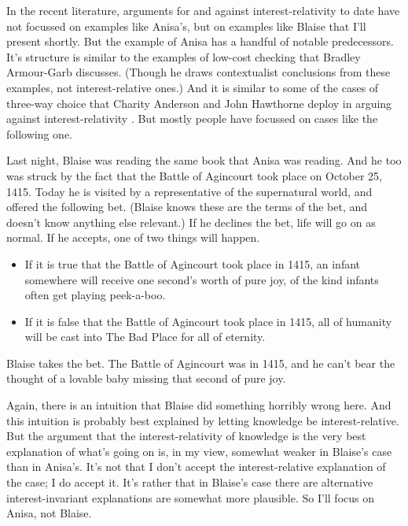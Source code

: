 \documentclass[
  11pt,
]{book}
\providecommand{\tightlist}{%
  \setlength{\itemsep}{0pt}\setlength{\parskip}{0pt}}
\begin{document}
In the recent literature, arguments for and against interest-relativity to date have not focussed on examples like Anisa's, but on examples like Blaise that I'll present shortly. But the example of Anisa has a handful of notable predecessors. It's structure is similar to the examples of low-cost checking that Bradley Armour-Garb \citeyearpar{ArmourGarb2011} discusses. (Though he draws contextualist conclusions from these examples, not interest-relative ones.) And it is similar to some of the cases of three-way choice that Charity Anderson and John Hawthorne deploy in arguing against interest-relativity \citetext{\citeyear{AndersonHawthorne2019a}; \citeyear{AndersonHawthorne2019b}}. But mostly people have focussed on cases like the following one.

Last night, Blaise was reading the same book that Anisa was reading. And he too was struck by the fact that the Battle of Agincourt took place on October 25, 1415. Today he is visited by a representative of the supernatural world, and offered the following bet. (Blaise knows these are the terms of the bet, and doesn't know anything else relevant.) If he declines the bet, life will go on as normal. If he accepts, one of two things will happen.

\begin{itemize}
\tightlist
\item
  If it is true that the Battle of Agincourt took place in 1415, an infant somewhere will receive one second's worth of pure joy, of the kind infants often get playing peek-a-boo.
\item
  If it is false that the Battle of Agincourt took place in 1415, all of humanity will be cast into The Bad Place for all of eternity.
\end{itemize}

Blaise takes the bet. The Battle of Agincourt was in 1415, and he can't bear the thought of a lovable baby missing that second of pure joy.

Again, there is an intuition that Blaise did something horribly wrong here. And this intuition is probably best explained by letting knowledge be interest-relative. But the argument that the interest-relativity of knowledge is the very best explanation of what's going on is, in my view, somewhat weaker in Blaise's case than in Anisa's. It's not that I don't accept the interest-relative explanation of the case; I do accept it. It's rather that in Blaise's case there are alternative interest-invariant explanations are somewhat more plausible. So I'll focus on Anisa, not Blaise.
\end{document}
